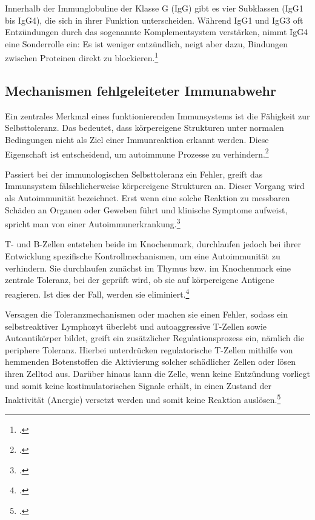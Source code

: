 \documentclass[a4paper, 12pt]{scrreprt}
\begin{document}
Innerhalb der Immunglobuline der Klasse G (IgG) gibt es vier Subklassen (IgG1 bis IgG4), die sich in ihrer Funktion unterscheiden. Während IgG1 und IgG3 oft Entzündungen durch das sogenannte Komplementsystem verstärken, nimmt IgG4 eine Sonderrolle ein: Es ist weniger entzündlich, neigt aber dazu, Bindungen zwischen Proteinen direkt zu blockieren.\footcite{doccheck_igg, AntwerpesIgG4}

\clearpage

\subsection{Mechanismen fehlgeleiteter Immunabwehr}

Ein zentrales Merkmal eines funktionierenden Immunsystems ist die Fähigkeit zur Selbsttoleranz. Das bedeutet, dass körpereigene Strukturen unter normalen Bedingungen nicht als Ziel einer Immunreaktion erkannt werden. Diese Eigenschaft ist entscheidend, um autoimmune Prozesse zu verhindern.\footcite{Smith1999}

Passiert bei der immunologischen Selbsttoleranz ein Fehler, greift das Immunsystem fälschlicherweise körpereigene Strukturen an. Dieser Vorgang wird als Autoimmunität bezeichnet. Erst wenn eine solche Reaktion zu messbaren Schäden an Organen oder Geweben führt und klinische Symptome aufweist, spricht man von einer Autoimmunerkrankung.\footcite{Fernandez2026}

T- und B-Zellen entstehen beide im Knochenmark, durchlaufen jedoch bei ihrer Entwicklung spezifische Kontrollmechanismen, um eine Autoimmunität zu verhindern. Sie durchlaufen zunächst im Thymus bzw. im Knochenmark eine zentrale Toleranz, bei der geprüft wird, ob sie auf körpereigene Antigene reagieren. Ist dies der Fall, werden sie eliminiert.\footcite{DocCheckLymphozyt}

Versagen die Toleranzmechanismen oder machen sie einen Fehler, sodass ein selbstreaktiver Lymphozyt überlebt und autoaggressive T-Zellen sowie Autoantikörper bildet, greift ein zusätzlicher Regulationsprozess ein, nämlich die periphere Toleranz. Hierbei unterdrücken regulatorische T-Zellen mithilfe von hemmenden Botenstoffen die Aktivierung solcher schädlicher Zellen oder lösen ihren Zelltod aus. Darüber hinaus kann die Zelle, wenn keine Entzündung vorliegt und somit keine kostimulatorischen Signale erhält, in einen Zustand der Inaktivität (Anergie) versetzt werden und somit keine Reaktion auslösen.\footcite{Macian2004}
\end{document}

